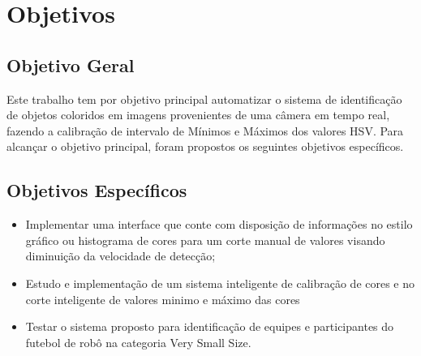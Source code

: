 \section{Objetivos} \label{Sec:Objetivos}

\subsection{Objetivo Geral} \label{Sec:ObjetivoGeral}
Este trabalho tem por objetivo principal automatizar o sistema de identificação de objetos 
coloridos em imagens provenientes de uma câmera  em tempo real, fazendo a calibração de intervalo de Mínimos e Máximos dos valores HSV.  
Para alcançar o objetivo principal, foram propostos os seguintes objetivos específicos.

\subsection{Objetivos Específicos} \label{Sec:ObjetivosEspecificos}

\begin{itemize}
	
	\item Implementar uma interface que conte com disposição de informações no estilo gráfico ou histograma de cores para um corte manual de valores
	visando diminuição da velocidade de detecção; 
	\item Estudo e implementação de um sistema inteligente de calibração de cores e no corte inteligente de valores minimo e máximo das cores
	\item Testar o sistema proposto para identificação de equipes e participantes do futebol 
	de robô na categoria Very Small Size. 
	
	
\end{itemize}

\newpage



